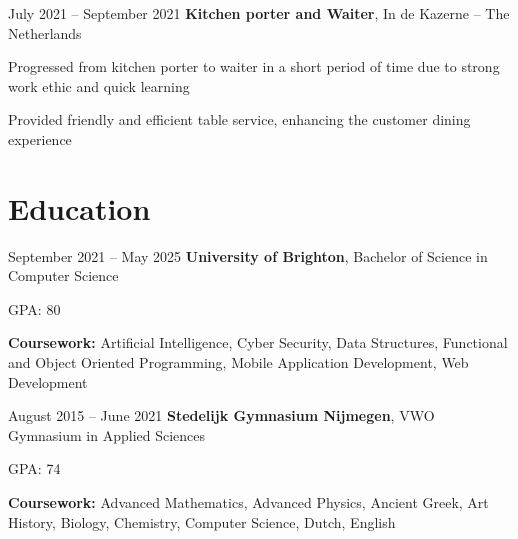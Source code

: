 	\vspace{0.2 cm}
	
		\begin{twocolentry}{
			July 2021 – September 2021
		}
		\textbf{Kitchen porter and Waiter}, In de Kazerne -- The Netherlands\end{twocolentry}
	
	\vspace{0.10 cm}
	\begin{onecolentry}
		\begin{highlights}
			\item Progressed from kitchen porter to waiter in a short period of time due to strong work ethic and quick learning
			\item Provided friendly and efficient table service, enhancing the customer dining experience
		\end{highlights}
	\end{onecolentry}
	
	\section{Education}
	
	\begin{twocolentry}{
			September 2021 – May 2025
		}
		\textbf{University of Brighton}, Bachelor of Science in Computer Science\end{twocolentry}
	
	\vspace{0.10 cm}
	\begin{onecolentry}
		\begin{highlights}
			\item GPA: 80
			\item \textbf{Coursework:} Artificial Intelligence, Cyber Security, Data Structures, Functional and Object Oriented Programming, Mobile Application Development, Web Development
		\end{highlights}
	\end{onecolentry}
	
	\vspace{0.2 cm}
	
	\begin{twocolentry}{
			August 2015 – June 2021
		}
		\textbf{Stedelijk Gymnasium Nijmegen}, VWO Gymnasium in Applied Sciences\end{twocolentry}
	
	\vspace{0.10 cm}
	\begin{onecolentry}
		\begin{highlights}
			\item GPA: 74
			\item \textbf{Coursework:} Advanced Mathematics, Advanced Physics, Ancient Greek, Art History, Biology, Chemistry, Computer Science, Dutch, English
		\end{highlights}
	\end{onecolentry}
		

